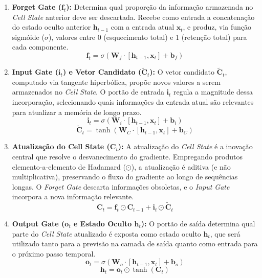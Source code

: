 \begin{enumerate}
    \item \textbf{Forget Gate ($\mathbf{f}_t$):} Determina qual proporção da informação armazenada no \textit{Cell State} anterior deve ser descartada. Recebe como entrada a concatenação do estado oculto anterior $\textbf{h}_{t-1}$ com a entrada atual $\textbf{x}_t$, e produz, via função sigmóide ($\sigma$), valores entre 0 (esquecimento total) e 1 (retenção total) para cada componente.
    \begin{equation} \mathbf{f}_t = \sigma(\mathbf{W}_f \cdot [\mathbf{h}_{t-1}, \mathbf{x}_t] + \mathbf{b}_f) \end{equation}
    
    \item \textbf{Input Gate ($\mathbf{i}_t$) e Vetor Candidato ($\tilde{\mathbf{C}}_t$):} O vetor candidato $\tilde{\mathbf{C}}_t$, computado via tangente hiperbólica, propõe novos valores a serem armazenados no \textit{Cell State}. O portão de entrada $\mathbf{i}_t$ regula a magnitude dessa incorporação, selecionando quais informações da entrada atual são relevantes para atualizar a memória de longo prazo.
    \begin{equation} \mathbf{i}_t = \sigma(\mathbf{W}_i \cdot [\mathbf{h}_{t-1}, \mathbf{x}_t] + \mathbf{b}_i) \end{equation}
    \begin{equation} \tilde{\mathbf{C}}_t = \tanh(\mathbf{W}_C \cdot [\mathbf{h}_{t-1}, \mathbf{x}_t] + \mathbf{b}_C) \end{equation}
    
    \item \textbf{Atualização do Cell State ($\mathbf{C}_t$):} A atualização do \textit{Cell State} é a inovação central que resolve o desvanecimento do gradiente. Empregando produtos elemento-a-elemento de Hadamard ($\odot$), a atualização é aditiva (e não multiplicativa), preservando o fluxo do gradiente ao longo de sequências longas. O \textit{Forget Gate} descarta informações obsoletas, e o \textit{Input Gate} incorpora a nova informação relevante.
    \begin{equation} \mathbf{C}_t = \mathbf{f}_t \odot \mathbf{C}_{t-1} + \mathbf{i}_t \odot \tilde{\mathbf{C}}_t \end{equation}
    
    \item \textbf{Output Gate ($\mathbf{o}_t$ e Estado Oculto $\mathbf{h}_t$):} O portão de saída determina qual parte do \textit{Cell State} atualizado é exposta como estado oculto $\mathbf{h}_t$, que será utilizado tanto para a previsão na camada de saída quanto como entrada para o próximo passo temporal.
    \begin{equation} \mathbf{o}_t = \sigma(\mathbf{W}_o \cdot [\mathbf{h}_{t-1}, \mathbf{x}_t] + \mathbf{b}_o) \end{equation}
    \begin{equation} \mathbf{h}_t = \mathbf{o}_t \odot \tanh(\mathbf{C}_t) \end{equation}
\end{enumerate}

